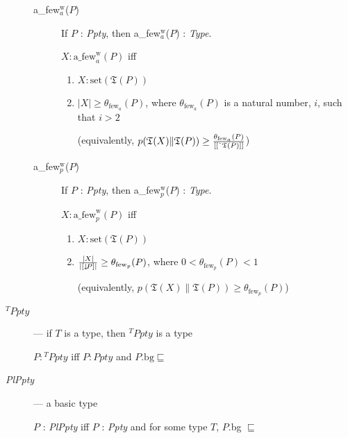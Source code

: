 \begin{description}
\begin{description}
\item[\textnormal{a\_few$_a^{\text{w}}$($P$)}] \mbox{}

  If $P$ : \textit{Ppty}, then a\_few$_a^{\text{w}}$($P$) :
  \textit{Type}.

  $X:\text{a\_few}_a^{\text{w}}(P)$ iff
\begin{enumerate} 
 
\item $X:\mathrm{set}(\mathfrak{T}(P))$ 
 
\item $|X|\geq\theta_{\text{few}_a}(P)$, where
  $\theta_{\text{few}_a}(P)$ is a natural number, $i$, such that $i>2$

  (equivalently, $p(\mathfrak{T}(X)\|\mathfrak{T}(P))\geq\frac{\theta_{\text{few}_a}(P)}{[[\ \!\check{}\ \!\mathfrak{T}(P)]]}$)
 
\end{enumerate}

\item[\textnormal{a\_few$_p^{\text{w}}$($P$)}] \mbox{}

  If $P$ : \textit{Ppty}, then a\_few$_p^{\text{w}}$($P$) :
  \textit{Type}.

  $X:\text{a\_few}_p^{\text{w}}(P)$ iff
\begin{enumerate} 
 
\item $X:\mathrm{set}(\mathfrak{T}(P))$ 
 
\item $\frac{|X|}{|[\downarrow\!P]|}\geq\theta_{\text{few}_p}(P)$, where
  $0<\theta_{\text{few}_p}(P)<1$

  (equivalently, $p(\mathfrak{T}(X)\|\mathfrak{T}(P))\geq\theta_{\text{few}_p}(P)$)
 
\end{enumerate}  

  
\end{description}

\item[\textnormal{$^T\textit{Ppty}$}] --- if $T$ is a type, then
  $^T\textit{Ppty}$ is a type

  $P:{^T\textit{Ppty}}$ iff $P:\textit{Ppty}$ and
  $P.\text{bg}\sqsubseteq$ 
        
      \item[\textnormal{\textit{PlPpty}}] --- a basic type

        $P$ : \textit{PlPpty} iff $P$ : \textit{Ppty} and for some type $T$,
$P$.bg $\sqsubseteq$  
        

\end{description}
